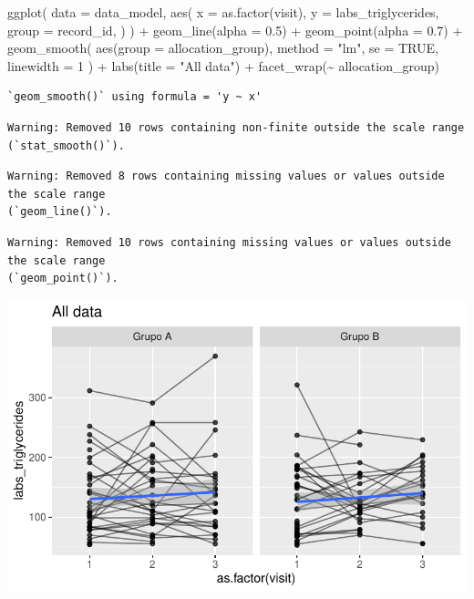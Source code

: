 \documentclass[
  letterpaper,
  DIV=11,
  numbers=noendperiod]{scrartcl}
\newenvironment{Shaded}{\begin{snugshade}}{\end{snugshade}}
\newcommand{\AttributeTok}[1]{\textcolor[rgb]{0.40,0.45,0.13}{#1}}
\newcommand{\ConstantTok}[1]{\textcolor[rgb]{0.56,0.35,0.01}{#1}}
\newcommand{\DecValTok}[1]{\textcolor[rgb]{0.68,0.00,0.00}{#1}}
\newcommand{\FloatTok}[1]{\textcolor[rgb]{0.68,0.00,0.00}{#1}}
\newcommand{\FunctionTok}[1]{\textcolor[rgb]{0.28,0.35,0.67}{#1}}
\newcommand{\NormalTok}[1]{\textcolor[rgb]{0.00,0.23,0.31}{#1}}
\newcommand{\SpecialCharTok}[1]{\textcolor[rgb]{0.37,0.37,0.37}{#1}}
\newcommand{\StringTok}[1]{\textcolor[rgb]{0.13,0.47,0.30}{#1}}
\begin{document}
\begin{Shaded}
\begin{Highlighting}[]
\FunctionTok{ggplot}\NormalTok{(}
    \AttributeTok{data =}\NormalTok{ data\_model, }
    \FunctionTok{aes}\NormalTok{(}
        \AttributeTok{x =} \FunctionTok{as.factor}\NormalTok{(visit),}
        \AttributeTok{y =}\NormalTok{ labs\_triglycerides,}
        \AttributeTok{group =}\NormalTok{ record\_id,}
\NormalTok{    )}
\NormalTok{) }\SpecialCharTok{+}
    \FunctionTok{geom\_line}\NormalTok{(}\AttributeTok{alpha =} \FloatTok{0.5}\NormalTok{) }\SpecialCharTok{+}
    \FunctionTok{geom\_point}\NormalTok{(}\AttributeTok{alpha =} \FloatTok{0.7}\NormalTok{) }\SpecialCharTok{+}
    \FunctionTok{geom\_smooth}\NormalTok{(}
        \FunctionTok{aes}\NormalTok{(}\AttributeTok{group =}\NormalTok{ allocation\_group),}
        \AttributeTok{method =} \StringTok{"lm"}\NormalTok{,}
        \AttributeTok{se =} \ConstantTok{TRUE}\NormalTok{,}
        \AttributeTok{linewidth =} \DecValTok{1}
\NormalTok{    ) }\SpecialCharTok{+}
    \FunctionTok{labs}\NormalTok{(}\AttributeTok{title =} \StringTok{"All data"}\NormalTok{) }\SpecialCharTok{+}
    \FunctionTok{facet\_wrap}\NormalTok{(}\SpecialCharTok{\textasciitilde{}}\NormalTok{ allocation\_group) }
\end{Highlighting}
\end{Shaded}

\begin{verbatim}
`geom_smooth()` using formula = 'y ~ x'
\end{verbatim}

\begin{verbatim}
Warning: Removed 10 rows containing non-finite outside the scale range
(`stat_smooth()`).
\end{verbatim}

\begin{verbatim}
Warning: Removed 8 rows containing missing values or values outside the scale range
(`geom_line()`).
\end{verbatim}

\begin{verbatim}
Warning: Removed 10 rows containing missing values or values outside the scale range
(`geom_point()`).
\end{verbatim}

\includegraphics{Outcomes_V1V2V3_files/figure-pdf/labs_triglycerides_6-1.pdf}
\end{document}
